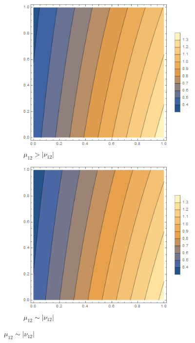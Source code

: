 \documentclass[12pt,a4]{article}
\begin{document}
\begin{figure}[!ht]
	\begin{subfigure}[b]{0.3\textwidth}
		\centering
		\includegraphics[width=\textwidth]{Joonised/Theta22Mu11Mu22I}
		\caption{$ \mu_{12} > |\nu_{12}| $}
	\end{subfigure}
	\hfill
	\begin{subfigure}[b]{0.3\textwidth}
		\centering
		\includegraphics[width=\textwidth]{Joonised/Theta22Mu11Mu22II}
		\caption{$ \mu_{12} \sim | \nu_{12}| $}

\end{subfigure}
\end{figure}
\end{document}
